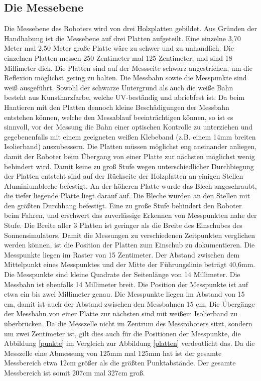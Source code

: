 \documentclass[a4paper,bibtotoc,oneside]{scrbook}
\begin{document}
\subsection{Die Messebene}\thispagestyle{empty}
Die Messebene des Roboters wird von drei Holzplatten gebildet. Aus Gründen der Handhabung ist die Messebene auf drei Platten aufgeteilt. Eine einzelne 3,70 Meter mal 2,50 Meter große Platte wäre zu schwer und zu unhandlich. Die einzelnen Platten messen 250 Zentimeter mal 125 Zentimeter, und sind 18 Millimeter dick.
Die Platten sind auf der Messseite schwarz angestrichen, um die Reflexion möglichst gering zu halten. Die Messbahn sowie die Messpunkte sind weiß ausgeführt. Sowohl der schwarze Untergrund als auch die weiße Bahn besteht aus Kunstharzfarbe, welche UV-beständig und abriebfest ist. Da beim Hantieren mit den Platten dennoch kleine Beschädigungen der Messbahn entstehen können, welche den Messablauf beeinträchtigen können, so ist es sinnvoll, vor der Messung die Bahn einer optischen Kontrolle zu unterziehen und gegebenenfalls mit einem geeigneten weißen Klebeband (z.B. einem 14mm breiten Isolierband) auszubessern.
Die Platten müssen möglichst eng aneinander anliegen, damit der Roboter beim Übergang von einer Platte zur nächsten möglichst wenig behindert wird. Damit keine zu groß Stufe wegen unterschiedlicher Durchbiegung der Platten entsteht sind auf der Rückseite der Holzplatten an einigen Stellen Aluminiumbleche befestigt. An der höheren Platte wurde das Blech angeschraubt, die tiefer liegende Platte liegt darauf auf. Die Bleche wurden an den Stellen mit den größten Durchhang befestigt.
Eine zu große Stufe behindert den Roboter beim Fahren, und erschwert das zuverlässige Erkennen von Messpunkten nahe der Stufe.
Die Breite aller 3 Platten ist geringer als die Breite des Einschubes des Sonnensimulators. Damit die Messungen zu verschiedenen Zeitpunkten verglichen werden können, ist die Position der Platten zum Einschub zu dokumentieren.
Die Messpunkte liegen im Raster von 15 Zentimeter. Der Abstand zwischen dem Mittelpunkt eines Messpunktes und der Mitte der Führungslinie beträgt 40,6mm. Die Messpunkte sind kleine Quadrate der Seitenlänge von 14 Millimeter. Die Messbahn ist ebenfalls 14 Millimeter breit. Die Position der Messpunkte ist auf etwa ein bis zwei Millimeter genau.
Die Messpunkte liegen im Abstand von 15 cm, damit ist auch der Abstand zwischen den Messbahnen 15 cm. Die Übergänge der Messbahn von einer Platte zur nächsten sind mit weißem Isolierband zu überbrücken. 
Da die Messzelle nicht im Zentrum des Messroboters sitzt, sondern um zwei Zentimeter ist, gilt dies auch für die Positionen der Messpunkte, die Abbildung \ref{punkte} im Vergleich zur Abbildung \ref{platten} verdeutlicht das.
Da die Messzelle eine Abmessung von 125mm mal 125mm hat ist der gesamte Messbereich etwa 12cm größer als die größten Punktabstände. Der gesamte Messbereich ist somit 207cm mal 327cm groß.
\end{document}
